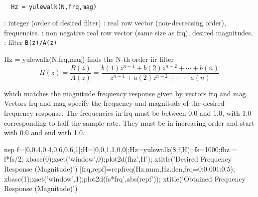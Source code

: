 \begin{mandesc}
   \\ %
\end{mandesc}
\begin{calling_sequence}
\begin{verbatim}
  Hz = yulewalk(N,frq,mag)   
\end{verbatim}
\end{calling_sequence}
\begin{parameters}
  \begin{varlist}
    : integer (order of desired filter)
    : real row vector (non-decreasing order), frequencies.
    : non negative real row vector (same size as frq), desired magnitudes.
    : filter \verb!B(z)/A(z)!
  \end{varlist}
\end{parameters}
\begin{mandescription}
  Hz = yulewalk(N,frq,mag) finds the N-th order iir filter
\[
H(z) = \frac{B(z)}{A(z)} = 
\frac{ b(1)z^{n-1}+b(2)z^{n-2}+\cdots + b(n)}%
{ z^{n-1}+a(2)z^{n-2}+\cdots + a(n)}
\]

which matches the magnitude frequency response given by vectors frq and mag.
Vectors frq and mag specify the frequency and magnitude of the desired
frequency response. The frequencies in frq must be between 0.0 and 1.0,
with 1.0 corresponding to half the sample rate. They must be in
increasing order and start with 0.0 and end with 1.0.
\end{mandescription}
\begin{examples}
  \begin{mintednsp}{nsp}
    f=[0,0.4,0.4,0.6,0.6,1];H=[0,0,1,1,0,0];Hz=yulewalk(8,f,H);
    fs=1000;fhz = f*fs/2;  
    xbasc(0);xset('window',0);plot2d(fhz',H');
    xtitle('Desired Frequency Response (Magnitude)')
    [frq,repf]=repfreq(Hz.num,Hz.den,frq=0:0.001:0.5);
    xbasc(1);xset('window',1);plot2d(fs*frq',abs(repf'));
    xtitle('Obtained Frequency Response (Magnitude)')
  \end{mintednsp}
\end{examples}
